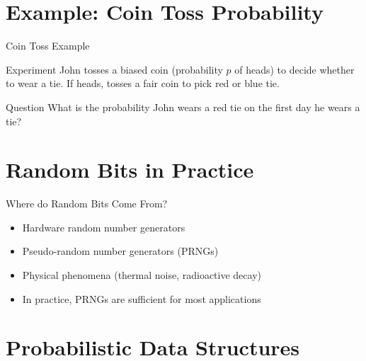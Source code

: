 \documentclass[aspectratio=169]{beamer}
\begin{document}
\section{Example: Coin Toss Probability}
\begin{frame}{Coin Toss Example}
  \begin{block}{Experiment}
    John tosses a biased coin (probability $p$ of heads) to decide whether to wear a tie. If heads, tosses a fair coin to pick red or blue tie.
  \end{block}

  \begin{block}{Question}
    What is the probability John wears a red tie on the first day he wears a tie?
  \end{block}

  \begin{center}
  \end{center}
\end{frame}

\section{Random Bits in Practice}
\begin{frame}{Where do Random Bits Come From?}
  \begin{itemize}
    \item Hardware random number generators

    \item Pseudo-random number generators (PRNGs)

    \item Physical phenomena (thermal noise, radioactive decay)

    \item In practice, PRNGs are sufficient for most applications
  \end{itemize}
\end{frame}

\section{Probabilistic Data Structures}
\end{document}
